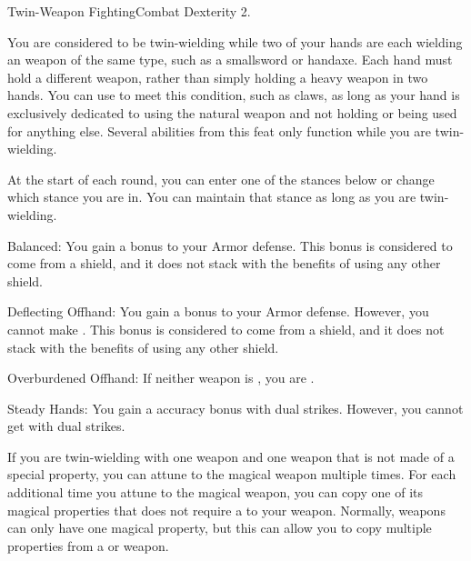   \begin{feat}{Twin-Weapon Fighting}{Combat}
    \featpre Dexterity 2.

     You are considered to be twin-wielding while two of your hands are each wielding an weapon of the same type, such as a smallsword or handaxe.
    Each hand must hold a different weapon, rather than simply holding a heavy weapon in two hands.
    You can use  to meet this condition, such as claws, as long as your hand is exclusively dedicated to using the natural weapon and not holding or being used for anything else.
    Several abilities from this feat only function while you are twin-wielding.

     At the start of each round, you can enter one of the stances below or change which stance you are in.
    You can maintain that stance as long as you are twin-wielding.
    \begin{raggeditemize}
      \item Balanced: You gain a  bonus to your Armor defense.
        This bonus is considered to come from a shield, and it does not stack with the benefits of using any other shield.
      \item Deflecting Offhand: You gain a  bonus to your Armor defense.
        However, you cannot make .
        This bonus is considered to come from a shield, and it does not stack with the benefits of using any other shield.
      \item Overburdened Offhand: If neither weapon is , you are \empowered.
      \item Steady Hands: You gain a  accuracy bonus with dual strikes.
        However, you cannot get  with dual strikes.
    \end{raggeditemize}

     If you are twin-wielding with one \magical weapon and one  weapon that is not made of a special property, you can attune to the magical weapon multiple times.
    For each additional time you attune to the magical weapon, you can copy one of its magical properties that does not require a  to your  weapon.
    Normally, weapons can only have one magical property, but this can allow you to copy multiple properties from a  or  weapon.


\end{feat}
